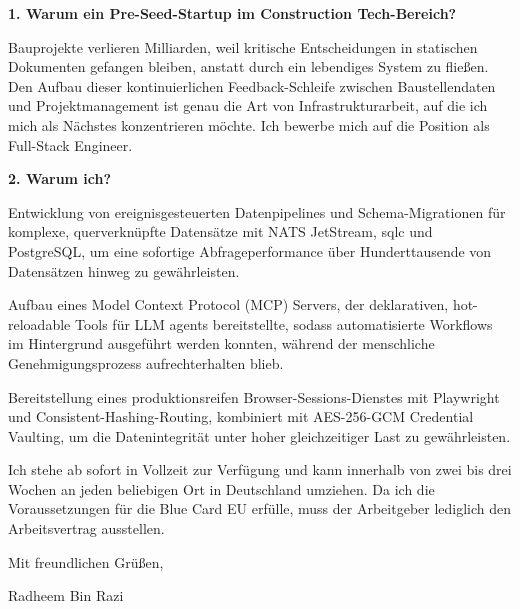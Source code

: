 \documentclass[11pt,a4paper]{coverletter}
\begin{document}
\vspace{8pt}\noindent\textbf{1. Warum ein Pre-Seed-Startup im Construction Tech-Bereich?}\par\vspace{3pt}

Bauprojekte verlieren Milliarden, weil kritische Entscheidungen in statischen Dokumenten gefangen bleiben, anstatt durch ein lebendiges System zu fließen. Den Aufbau dieser kontinuierlichen Feedback-Schleife zwischen Baustellendaten und Projektmanagement ist genau die Art von Infrastrukturarbeit, auf die ich mich als Nächstes konzentrieren möchte. Ich bewerbe mich auf die Position als Full-Stack Engineer.

\vspace{8pt}\noindent\textbf{2. Warum ich?}\par\vspace{3pt}

\bullets

  \item Entwicklung von ereignisgesteuerten Datenpipelines und Schema-Migrationen für komplexe, querverknüpfte Datensätze mit NATS JetStream, sqlc und PostgreSQL, um eine sofortige Abfrageperformance über Hunderttausende von Datensätzen hinweg zu gewährleisten.

  \item Aufbau eines Model Context Protocol (MCP) Servers, der deklarativen, hot-reloadable Tools für LLM agents bereitstellte, sodass automatisierte Workflows im Hintergrund ausgeführt werden konnten, während der menschliche Genehmigungsprozess aufrechterhalten blieb.

  \item Bereitstellung eines produktionsreifen Browser-Sessions-Dienstes mit Playwright und Consistent-Hashing-Routing, kombiniert mit AES-256-GCM Credential Vaulting, um die Datenintegrität unter hoher gleichzeitiger Last zu gewährleisten.

\bulletsend

Ich stehe ab sofort in Vollzeit zur Verfügung und kann innerhalb von zwei bis drei Wochen an jeden beliebigen Ort in Deutschland umziehen. Da ich die Voraussetzungen für die Blue Card EU erfülle, muss der Arbeitgeber lediglich den Arbeitsvertrag ausstellen.

\closing{Mit freundlichen Grüßen,}{Radheem Bin Razi}
\end{document}
